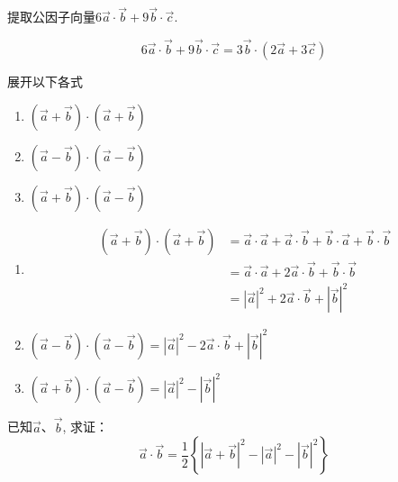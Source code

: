 \begin{example}
    提取公因子向量$6\vec{a}\cdot\vec{b}+9\vec{b}\cdot\vec{c}$.
\end{example}

\begin{solution}
   \[ 6\vec{a}\cdot\vec{b}+9\vec{b}\cdot\vec{c}=3\vec{b}\cdot \left(2\vec{a}+3\vec{c}\right)\]
\end{solution}

\begin{example}
    展开以下各式
    \begin{multicols}{3}
\begin{enumerate}
    \item $\left(\vec{a}+\vec{b}\right)\cdot \left(\vec{a}+\vec{b}\right)$
    \item $\left(\vec{a}-\vec{b}\right)\cdot \left(\vec{a}-\vec{b}\right)$
    \item $\left(\vec{a}+\vec{b}\right)\cdot \left(\vec{a}-\vec{b}\right)$
\end{enumerate}        
    \end{multicols}
\end{example}

\begin{solution}
\begin{enumerate}
    \item \[\begin{split}
   \left(\vec{a}+\vec{b}\right)\cdot \left(\vec{a}+\vec{b}\right)&=\vec{a}\cdot \vec{a}+\vec{a}\cdot \vec{b}+\vec{b}\cdot \vec{a}+\vec{b}\cdot \vec{b}\\
        &=\vec{a}\cdot \vec{a}+2\vec{a}\cdot \vec{b}+\vec{b}\cdot \vec{b}\\
        &=\left|\vec{a}\right|^2+2\vec{a}\cdot \vec{b}+\left|\vec{b}\right|^2
    \end{split}\]

    \item $\left(\vec{a}-\vec{b}\right)\cdot \left(\vec{a}-\vec{b}\right)=\left|\vec{a}\right|^2-2\vec{a}\cdot \vec{b}+\left|\vec{b}\right|^2$
    \item $\left(\vec{a}+\vec{b}\right)\cdot \left(\vec{a}-\vec{b}\right)=\left|\vec{a}\right|^2-\left|\vec{b}\right|^2$
\end{enumerate}
\end{solution}

\begin{example}
    已知$\vec{a}$、$\vec{b}$, 求证：
\[\vec{a}\cdot\vec{b} =\frac{1}{2}\left\{\left|\vec{a}+\vec{b}\right|^2-\left|\vec{a}\right|^2-\left|\vec{b}\right|^2\right\}\]
\end{example}

